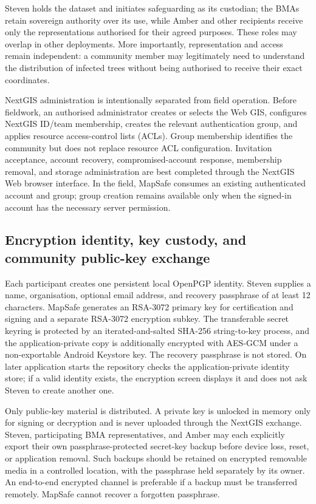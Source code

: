 \documentclass[a4paper,UKenglish,cleveref,autoref,thm-restate]{lipics-v2021}
\begin{document}
Steven holds the dataset and initiates safeguarding as its custodian; the BMAs retain sovereign authority over its use, while Amber and other recipients receive only the representations authorised for their agreed purposes. These roles may overlap in other deployments. More importantly, representation and access remain independent: a community member may legitimately need to understand the distribution of infected trees without being authorised to receive their exact coordinates.



NextGIS administration is intentionally separated from field operation. Before fieldwork, an authorised administrator creates or selects the Web GIS, configures NextGIS ID/team membership, creates the relevant authentication group, and applies resource access-control lists (ACLs). Group membership identifies the community but does not replace resource ACL configuration. Invitation acceptance, account recovery, compromised-account response, membership removal, and storage administration are best completed through the NextGIS Web browser interface. In the field, MapSafe consumes an existing authenticated account and group; group creation remains available only when the signed-in account has the necessary server permission.

\FloatBarrier
\subsection{Encryption identity, key custody, and community public-key exchange}
\label{sec:key-management}

Each participant creates one persistent local OpenPGP identity. Steven supplies a name, organisation, optional email address, and recovery passphrase of at least 12 characters. MapSafe generates an RSA-3072 primary key for certification and signing and a separate RSA-3072 encryption subkey. The transferable secret keyring is protected by an iterated-and-salted SHA-256 string-to-key process, and the application-private copy is additionally encrypted with AES-GCM under a non-exportable Android Keystore key. The recovery passphrase is not stored. On later application starts the repository checks the application-private identity store; if a valid identity exists, the encryption screen displays it and does not ask Steven to create another one.

Only public-key material is distributed. A private key is unlocked in memory only for signing or decryption and is never uploaded through the NextGIS exchange. Steven, participating BMA representatives, and Amber may each explicitly export their own passphrase-protected secret-key backup before device loss, reset, or application removal. Such backups should be retained on encrypted removable media in a controlled location, with the passphrase held separately by its owner. An end-to-end encrypted channel is preferable if a backup must be transferred remotely. MapSafe cannot recover a forgotten passphrase.
\end{document}
